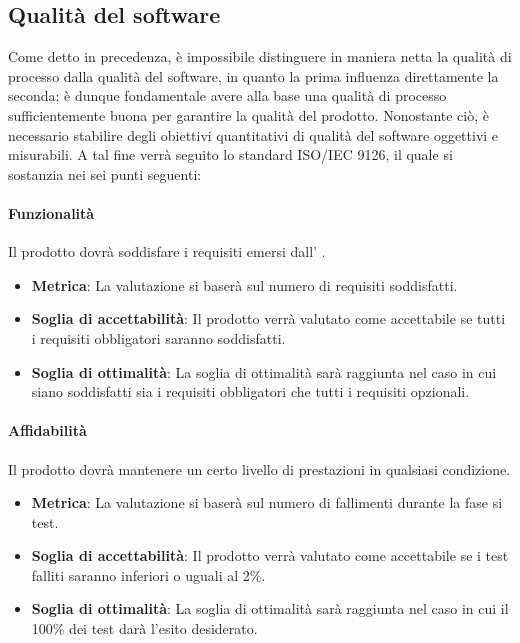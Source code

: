 \subsection{Qualità del software}
Come detto in precedenza, è impossibile distinguere in maniera netta la qualità di processo dalla qualità del software, in quanto la prima influenza direttamente la seconda; è dunque fondamentale avere alla base una qualità di processo sufficientemente buona per garantire la qualità del prodotto. Nonostante ciò, è necessario stabilire degli obiettivi quantitativi di qualità del software oggettivi e misurabili. A tal fine verrà seguito lo standard ISO/IEC 9126, il quale si sostanzia nei sei punti seguenti:

\paragraph{Funzionalità}
Il prodotto dovrà soddisfare i requisiti emersi dall' \AdR .
\begin{itemize}
	\item \textbf{Metrica}: La valutazione si baserà sul numero di requisiti soddisfatti.
	\item \textbf{Soglia di accettabilità}: Il prodotto verrà valutato come accettabile se tutti i requisiti obbligatori saranno soddisfatti.
	\item \textbf{Soglia di ottimalità}: La soglia di ottimalità sarà raggiunta nel caso in cui siano soddisfatti sia i requisiti obbligatori che tutti i requisiti opzionali.
\end{itemize}

\paragraph{Affidabilità}
Il prodotto dovrà mantenere un certo livello di prestazioni in qualsiasi condizione.

\begin{itemize}
	\item \textbf{Metrica}: La valutazione si baserà sul numero di fallimenti durante la fase si test.
	\item \textbf{Soglia di accettabilità}: Il prodotto verrà valutato come accettabile se i test falliti saranno inferiori o uguali al 2\%.
	\item \textbf{Soglia di ottimalità}: La soglia di ottimalità sarà raggiunta nel caso in cui il 100\% dei test darà l'esito desiderato.
\end{itemize}

